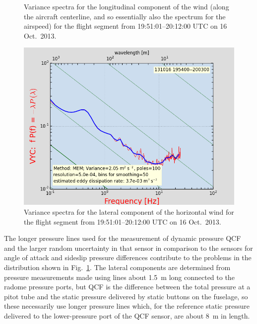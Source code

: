 \documentclass[12pt,twoside,english]{article}\usepackage[]{graphicx}\usepackage[]{color}
\let\OrgIndex\index
\renewcommand*{\index}[1]{\OrgIndex{#1}}
\begin{document}
{{\begin{figure}
\protect\caption{\label{fig:AppxB-PSD2}Variance spectra for the longitudinal component of the wind (along the aircraft centerline, and so essentially also the spectrum for the airspeed) for the flight segment from 19:51:01--20:12:00 UTC on 16 Oct.\ 2013.} 
\end{figure}

\begin{figure}
\noindent \begin{centering}
\includegraphics[height=0.4\textheight]{SpecialGraphics/PSD3.png}  
\par\end{centering}

\protect\caption{\label{fig:AppxB-PSD3}Variance spectra for the lateral component of the horizontal wind for the flight segment from 19:51:01--20:12:00 UTC on 16 Oct.\ 2013.} 
\end{figure}


% 
% 


The longer pressure lines used for the measurement of dynamic pressure QCF and the larger random uncertainty in that sensor in comparison to the sensors for angle of attack and sideslip pressure differences contribute to the problems in the distribution shown in Fig.~\ref{fig:AppxB-PSD2}. The lateral components are determined from pressure measurements made using lines about 1.5~m long connected to the radome pressure ports, but QCF is the difference between the total pressure at a pitot tube and the static pressure delivered by static buttons on the fuselage, so these necessarily use longer pressure lines which, for the reference static pressure delivered to the lower-pressure port of the QCF sensor, are about 8~m in length.

}}
\end{document}
